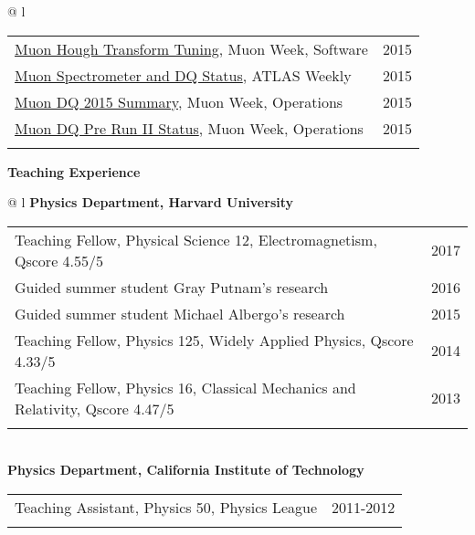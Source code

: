 \documentclass[letterpaper,11pt,oneside]{article}
\newcommand{\blue}[1]{\textcolor[rgb]{0,0,0.9}{#1}}
\begin{document}
\begin{flushleft}
\begin{tabular}{@{} l}
\begin{tabular}{@{} l l }
     \blue{\href{https://indico.cern.ch/event/465396/contributions/1984207}{Muon Hough Transform Tuning}}, Muon Week, Software & 2015\\
     \blue{\href{https://indico.cern.ch/event/444054/contributions/1099850}{Muon Spectrometer and DQ Status}}, ATLAS Weekly & 2015\\
     \blue{\href{https://indico.cern.ch/event/464848/contributions/1983327}{Muon DQ 2015 Summary}}, Muon Week, Operations & 2015\\
     \blue{\href{https://indico.cern.ch/event/376175/contributions/893495}{Muon DQ Pre Run II Status}}, Muon Week, Operations & 2015\\
     \hspace{0.8\linewidth} & \hspace{0.1\linewidth} \\
      \end{tabular}
      \end{tabular}
\end{flushleft}
\vspace{-0.25cm}
\raggedright
\textbf{\Large{Teaching Experience}} \\
\vspace{-0.5cm}
 \normalsize
\begin{flushleft}
\hspace{1cm}
 \begin{tabular}{@{} l}
    \textbf{Physics Department, Harvard University} \\ 
    \begin{tabular}{@{} l l }
 Teaching Fellow, Physical Science 12, Electromagnetism, Qscore 4.55/5  & 2017\\
 Guided summer student Gray Putnam's research & 2016\\
 Guided summer student Michael Albergo's research & 2015\\
 Teaching Fellow, Physics 125, Widely Applied Physics, Qscore 4.33/5  & 2014\\
 Teaching Fellow, Physics 16, Classical Mechanics and Relativity, Qscore 4.47/5 & 2013\\
    \hspace{0.8\linewidth} & \hspace{0.1\linewidth} \\
     \end{tabular}
     \\
     \textbf{Physics Department, California Institute of Technology} \\
     \begin{tabular}{@{} l l }
 Teaching Assistant, Physics 50, Physics League & 2011-2012\\
    \hspace{0.8\linewidth} & \hspace{0.1\linewidth} \\
      \end{tabular}
      \end{tabular}
\end{flushleft}
\end{document}
